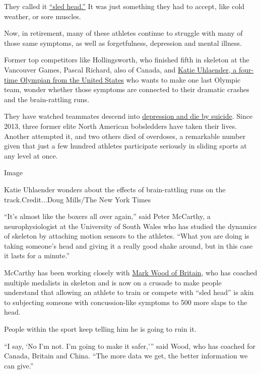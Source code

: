 They called it
\href{https://www.nytimes3xbfgragh.onion/2020/07/26/sports/olympics/olympics-bobsled-suicide-brain-injuries.html}{``sled
head.''} It was just something they had to accept, like cold weather, or
sore muscles.

Now, in retirement, many of these athletes continue to struggle with
many of those same symptoms, as well as forgetfulness, depression and
mental illness.

Former top competitors like Hollingsworth, who finished fifth in
skeleton at the Vancouver Games, Pascal Richard, also of Canada, and
\href{https://www.nytimes3xbfgragh.onion/2020/06/06/sports/olympics/coronavirus-olympic-training-tokyo.html}{Katie
Uhlaender, a four-time Olympian from the United States} who wants to
make one last Olympic team, wonder whether those symptoms are connected
to their dramatic crashes and the brain-rattling runs.

They have watched teammates descend into
\href{https://www.teamusa.org/News/2020/May/09/Pavle-Jovanovic-2006-Olympic-Bobsledder-Dies-By-Suicide}{depression
and die by suicide}. Since 2013, three former elite North American
bobsledders have taken their lives. Another attempted it, and two others
died of overdoses, a remarkable number given that just a few hundred
athletes participate seriously in sliding sports at any level at once.

Image

Katie Uhlaender wonders about the effects of brain-rattling runs on the
track.Credit...Doug Mills/The New York Times

``It's almost like the boxers all over again,'' said Peter McCarthy, a
neurophysiologist at the University of South Wales who has studied the
dynamics of skeleton by attaching motion sensors to the athletes. ``What
you are doing is taking someone's head and giving it a really good shake
around, but in this case it lasts for a minute.''

McCarthy has been working closely with
\href{https://www.ibsf.org/en/news/9-skeleton/20677-head-coach-talent-mark-wood-leaves-british-bobsleigh-skeleton-association}{Mark
Wood of Britain}, who has coached multiple medalists in skeleton and is
now on a crusade to make people understand that allowing an athlete to
train or compete with ``sled head'' is akin to subjecting someone with
concussion-like symptoms to 500 more slaps to the head.

People within the sport keep telling him he is going to ruin it.

``I say, `No I'm not. I'm going to make it safer,''' said Wood, who has
coached for Canada, Britain and China. ``The more data we get, the
better information we can give.''

